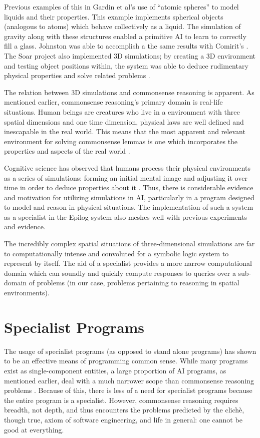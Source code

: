  Previous examples of this in Gardin et al's use of “atomic spheres” to model liquids and their properties. This example implements spherical objects (analogous to atoms) which behave collectively as a liquid. The simulation of gravity along with these structures enabled a primitive AI to learn to correctly fill a glass. Johnston was able to accomplish a the same results with Comirit's \cite{gardin1989analogical,johnston2008comirit}. The Soar project also implemented 3D simulations; by creating a 3D environment and testing object positions within, the system was able to deduce rudimentary physical properties and solve related problems \cite{wintermute2009overview}.

The relation between 3D simulations and commonsense reasoning is apparent. As mentioned earlier, commonsense reasoning's primary domain is real-life situations. Human beings are creatures who live in a environment with three spatial dimensions and one time dimension, physical laws are well defined and inescapable in the real world. This means that the most apparent and relevant environment for solving commonsense lemmas is one which incorporates the properties and aspects of the real world \cite{johnston2008comirit,johnston2009practical}.

Cognitive science has observed that humans process their physical environments as a series of simulations: forming an initial mental image and adjusting it over time in order to deduce properties about it \cite{gardin1989analogical}. 
Thus, there is considerable evidence and motivation for utilizing simulations in AI, particularly in a program designed to model and reason in physical situations.
The implementation of such a system as a specialist in the Epilog system also meshes well with previous experiments and evidence.

The incredibly complex spatial situations of three-dimensional simulations are far to computationally intense and convoluted for a symbolic logic system to represent by itself. 
The aid of a specialist provides a more narrow computational domain which can soundly and quickly compute responses to queries over a sub-domain of problems (in our case, problems pertaining to reasoning in spatial environments).

\section{Specialist Programs}
The usage of specialist programs (as opposed to stand alone programs) has shown to be an effective means of programming common sense. While many programs exist as single-component entities, a large proportion of AI programs, as mentioned earlier, deal with a much narrower scope than commonsense reasoning problems \cite{johnston2008comirit,johnston2009practical}. Because of this, there is less of a need for specialist programs because the entire program is a specialist. However, commonsense reasoning requires breadth, not depth, and thus encounters the problems predicted by the clich\`{e}, though true, axiom of software engineering, and life in general: one cannot be good at everything.

